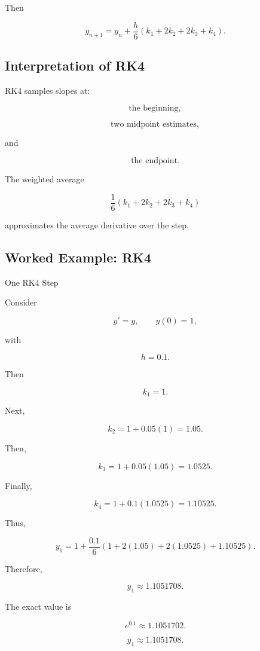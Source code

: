 Then

\[
\boxed{
y_{n+1}
=
y_n
+
\frac{h}{6}
(
k_1+2k_2+2k_3+k_4
).
}
\]

\subsection{Interpretation of RK4}
\label{subsec:rk4-interpretation}

RK4 samples slopes at:

\[
\boxed{
\text{the beginning},
}
\]

\[
\boxed{
\text{two midpoint estimates},
}
\]

and

\[
\boxed{
\text{the endpoint}.
}
\]

The weighted average

\[
\frac16
(
k_1+2k_2+2k_3+k_4
)
\]

approximates the average derivative over the step.

\subsection{Worked Example: RK4}
\label{subsec:worked-rk4}

\begin{workedexamplebox}{One RK4 Step}

Consider

\[
y'=y,
\qquad
y(0)=1,
\]

with

\[
h=0.1.
\]

Then

\[
k_1=1.
\]

Next,

\[
k_2
=
1+0.05(1)
=
1.05.
\]

Then,

\[
k_3
=
1+0.05(1.05)
=
1.0525.
\]

Finally,

\[
k_4
=
1+0.1(1.0525)
=
1.10525.
\]

Thus,

\[
y_1
=
1
+
\frac{0.1}{6}
\left(
1
+
2(1.05)
+
2(1.0525)
+
1.10525
\right).
\]

Therefore,

\[
y_1
\approx1.1051708.
\]

The exact value is

\[
e^{0.1}
\approx1.1051702.
\]

\begin{answerbox}
\[
\boxed{
y_1\approx1.1051708.
}
\]
\end{answerbox}

\end{workedexamplebox}

